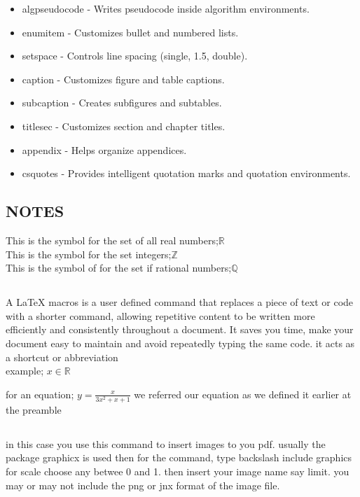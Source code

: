 \documentclass[a4paper,12pt]{article}
\def\eq1{y=\frac{x}{3x^2+x+1}}
\newcommand{\R}{\mathbb{R}}
\begin{document}
{\begin{itemize}
\item algpseudocode - Writes pseudocode inside algorithm environments.

\item enumitem     - Customizes bullet and numbered lists.
\item setspace     - Controls line spacing (single, 1.5, double).
\item caption      - Customizes figure and table captions.
\item subcaption   - Creates subfigures and subtables.
\item titlesec     - Customizes section and chapter titles.
\item appendix     - Helps organize appendices.
\item csquotes     - Provides intelligent quotation marks and quotation environments.
\end{itemize}

\subsection*{{NOTES}}

This is the symbol for the set of all real numbers;$\mathbb{R}$\\
This is the symbol for the set  integers;$\mathbb{Z}$\\
This is the symbol of for the set if rational numbers;$\mathbb{Q}$


\subsection{}

A \LaTeX{} macros is a user defined command that replaces a piece of text or code with a shorter command, allowing repetitive content to be written more efficiently and consistently throughout a document. It saves you time, make your document easy to maintain and avoid repeatedly typing the same code.
it acts as a shortcut or abbreviation\\
 example;
$x \in \R$


for an equation;
$\eq1$
we referred our equation as we defined it earlier at the preamble
\subsection{}
in this case you use this command to insert images to you pdf. usually the package graphicx is used then for the command, type backslash include graphics for scale choose any betwee 0 and 1. then insert your image name say limit. you may or may not include the png or jnx format of the image file.





}
\end{document}
